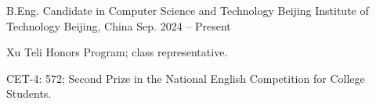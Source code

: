 
\begin{cventries}

  \cventry
    {B.Eng. Candidate in Computer Science and Technology}
    {Beijing Institute of Technology}
    {Beijing, China}
    {Sep. 2024 -- Present}
    {
      \begin{cvitems}
        \item {Xu Teli Honors Program; class representative.}
        \item {CET-4: 572; Second Prize in the National English Competition for College Students.}
      \end{cvitems}
    }

\end{cventries}

